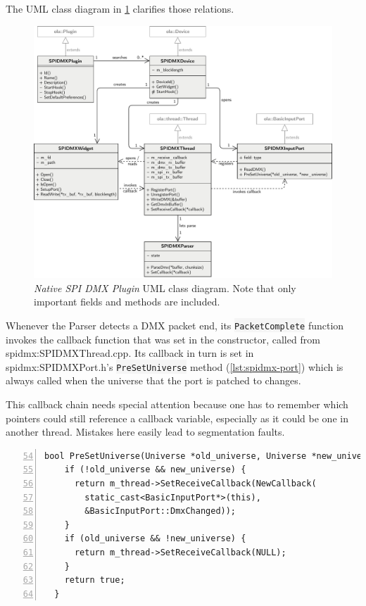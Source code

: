 The UML class diagram in \cref{fig:spidmx-class-diagram} clarifies those
relations.

\begin{figure}
\centering
\includegraphics[width=1.00000\textwidth]{Bilder/spidmx-class-diagram.pdf}
\caption[\emph{Native SPI DMX Plugin} UML class diagram]{\emph{Native SPI DMX Plugin} UML class diagram. Note that only
important fields and methods are
included.}\label{fig:spidmx-class-diagram}
\end{figure}

Whenever the Parser detects a DMX
packet end, its \colorbox{WhiteSmoke}{\lstinline!PacketComplete!} function invokes the callback
function that was set in the constructor, called from
\gls{spidmx:SPIDMXThread.cpp}. Its callback in turn is set in
\gls{spidmx:SPIDMXPort.h}'s \colorbox{WhiteSmoke}{\lstinline!PreSetUniverse!} method
(\cref{lst:spidmx-port}) which is always called when the universe that
the port is patched to changes.

This callback chain needs special attention because one has to remember
which pointers could still reference a callback variable, especially as
it could be one in another thread. Mistakes here easily lead to
segmentation faults.

\begin{lstlisting}[numbers=left, style=myCpp, firstnumber=54, caption={[Excerpt from \glsfont{SPIDMXPort.h}]Excerpt from \gls{spidmx:SPIDMXPort.h}.}, label=lst:spidmx-port]
  bool PreSetUniverse(Universe *old_universe, Universe *new_universe) {
    if (!old_universe && new_universe) {
      return m_thread->SetReceiveCallback(NewCallback(
        static_cast<BasicInputPort*>(this),
        &BasicInputPort::DmxChanged));
    }
    if (old_universe && !new_universe) {
      return m_thread->SetReceiveCallback(NULL);
    }
    return true;
  }
\end{lstlisting}

